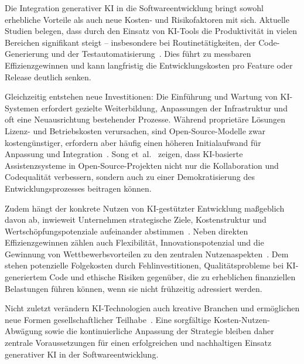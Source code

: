 
Die Integration generativer KI in die Softwareentwicklung bringt sowohl
erhebliche Vorteile als auch neue Kosten- und Risikofaktoren mit sich. Aktuelle
Studien belegen, dass durch den Einsatz von KI-Tools die Produktivität in
vielen Bereichen signifikant steigt – insbesondere bei Routinetätigkeiten, der
Code-Generierung und der Testautomatisierung~\cite{marguerit_augmenting_2025,
    farach_evolving_2025, habibi_open_2025}. Dies führt zu messbaren
Effizienzgewinnen und kann langfristig die Entwicklungskosten pro Feature oder
Release deutlich senken.

Gleichzeitig entstehen neue Investitionen: Die Einführung und Wartung von
KI-Systemen erfordert gezielte Weiterbildung, Anpassungen der Infrastruktur und
oft eine Neuausrichtung bestehender Prozesse. Während proprietäre Lösungen
Lizenz- und Betriebskosten verursachen, sind Open-Source-Modelle zwar
kostengünstiger, erfordern aber häufig einen höheren Initialaufwand für
Anpassung und Integration~\cite{habibi_open_2025}. Song
et~al.~\cite{song_impact_2024} zeigen, dass KI-basierte Assistenzsysteme in
Open-Source-Projekten nicht nur die Kollaboration und Codequalität verbessern,
sondern auch zu einer Demokratisierung des Entwicklungsprozesses beitragen
können.

Zudem hängt der konkrete Nutzen von KI-gestützter Entwicklung maßgeblich davon
ab, inwieweit Unternehmen strategische Ziele, Kostenstruktur und
Wertschöpfungspotenziale aufeinander
abstimmen~\cite{mcnamara_exponential_2025}. Neben direkten Effizienzgewinnen
zählen auch Flexibilität, Innovationspotenzial und die Gewinnung von
Wettbewerbsvorteilen zu den zentralen
Nutzenaspekten~\cite{storey_generative_2025}. Dem stehen potenzielle
Folgekosten durch Fehlinvestitionen, Qualitätsprobleme bei KI-generiertem Code
und ethische Risiken gegenüber, die zu erheblichen finanziellen Belastungen
führen können, wenn sie nicht frühzeitig adressiert werden.

Nicht zuletzt verändern KI-Technologien auch kreative Branchen und ermöglichen
neue Formen gesellschaftlicher Teilhabe~\cite{anantrasirichai_artificial_2025}.
Eine sorgfältige Kosten-Nutzen-Abwägung sowie die kontinuierliche Anpassung der
Strategie bleiben daher zentrale Voraussetzungen für einen erfolgreichen und
nachhaltigen Einsatz generativer KI in der Softwareentwicklung.

